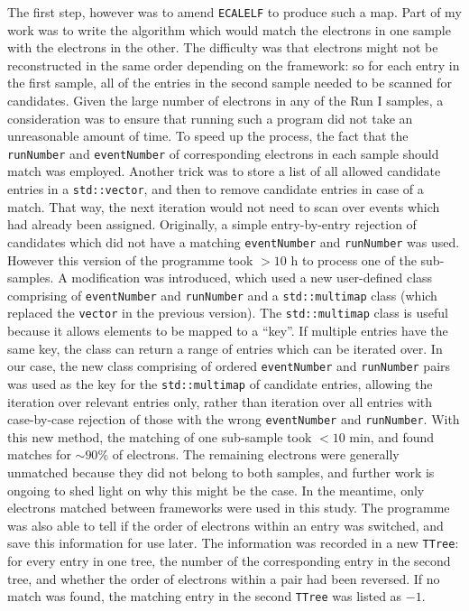 \documentclass[10pt]{article}
\begin{document}
The first step, however was to amend \texttt{ECALELF} to produce such a map. Part of my work was to write the algorithm which would match the electrons in one sample with the electrons in the other. The difficulty was that electrons might not be reconstructed in the same order depending on the framework: so for each entry in the first sample, all of the entries in the second sample needed to be scanned for candidates. Given the large number of electrons in any of the Run I samples, a consideration was to ensure that running such a program did not take an unreasonable amount of time. To speed up the process, the fact that the \texttt{runNumber} and \texttt{eventNumber} of corresponding electrons in each sample should match was employed. Another trick was to store a list of all allowed candidate entries in a \texttt{std::vector}, and then to remove candidate entries in case of a match. That way, the next iteration would not need to scan over events which had already been assigned. Originally, a simple entry-by-entry rejection of candidates which did not have a matching \texttt{eventNumber} and \texttt{runNumber} was used. However this version of the programme took $>10$ h to process one of the sub-samples. A modification was introduced, which used a new user-defined class comprising of \texttt{eventNumber} and \texttt{runNumber} and a \texttt{std::multimap} class (which replaced the \texttt{vector} in the previous version). The \texttt{std::multimap} class is useful because it allows elements to be mapped to a ``key''. If multiple entries have the same key, the class can return a range of entries which can be iterated over. In our case, the new class comprising of ordered \texttt{eventNumber} and \texttt{runNumber} pairs was used as the key for the  \texttt{std::multimap} of candidate entries, allowing the iteration over relevant entries only, rather than iteration over all entries with case-by-case rejection of those with the wrong \texttt{eventNumber} and \texttt{runNumber}. With this new method, the matching of one sub-sample took $<10$ min, and found matches for $\sim 90\%$ of electrons. The remaining electrons were generally unmatched because they did not belong to both samples, and further work is ongoing to shed light on why this might be the case. In the meantime, only electrons matched between frameworks were used in this study. The programme was also able to tell if the order of electrons within an entry was switched, and save this information for use later. The information was recorded in a new \texttt{TTree}: for every entry in one tree, the number of the corresponding entry in the second tree, and whether the order of electrons within a pair had been reversed. If no match was found, the matching entry in the second \texttt{TTree} was listed as $-1$.
\end{document}

